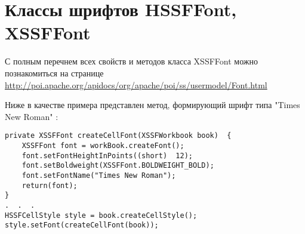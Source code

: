 \section{Классы шрифтов HSSFFont, XSSFFont}

С полным перечнем всех свойств и методов класса XSSFFont можно познакомиться на странице\\
\href{http://poi.apache.org/apidocs/org/apache/poi/ss/usermodel/Font.html}{http://poi.apache.org/apidocs/org/apache/poi/ss/usermodel/Font.html}

Ниже в качестве примера представлен метод, формирующий шрифт типа "Times New Roman" :

\begin{lstlisting}
private XSSFFont createCellFont(XSSFWorkbook book)  {  	
	XSSFFont font = workBook.createFont(); 
	font.setFontHeightInPoints((short)  12); 
	font.setBoldweight(XSSFFont.BOLDWEIGHT_BOLD); 
	font.setFontName("Times New Roman");  
	return(font);  
}  
.  .  .  
HSSFCellStyle style = book.createCellStyle(); style.setFont(createCellFont(book));
\end{lstlisting}
